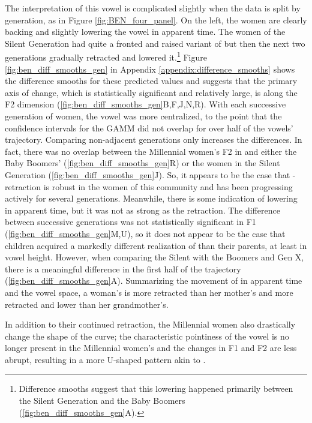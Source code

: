 The interpretation of this vowel is complicated slightly when the data is split by generation, as in Figure \ref{fig:BEN_four_panel}. On the left, the women are clearly backing and slightly lowering the vowel in apparent time. The women of the Silent Generation had quite a fronted and raised variant of \ben but then the next two generations gradually retracted and lowered it.\footnote{Difference smooths suggest that this lowering happened primarily between the Silent Generation and the Baby Boomers (\ref{fig:ben_diff_smooths_gen}A).} Figure \ref{fig:ben_diff_smooths_gen} in Appendix \ref{appendix:difference_smooths} shows the difference smooths for these predicted values and suggests that the primary axis of change, which is statistically significant and relatively large, is along the F2 dimension (\ref{fig:ben_diff_smooths_gen}B,F,J,N,R). With each successive generation of women, the vowel was more centralized, to the point that the confidence intervals for the GAMM did not overlap for over half of the vowels' trajectory. Comparing non-adjacent generations only increases the differences. In fact, there was no overlap between the Millennial women's F2 in \ben and either the Baby Boomers' (\ref{fig:ben_diff_smooths_gen}R) or the women in the Silent Generation (\ref{fig:ben_diff_smooths_gen}J). So, it appears to be the case that \ben-retraction is robust in the women of this community and has been progressing actively for several generations. Meanwhile, there is some indication of \ben lowering in apparent time, but it was not as strong as the retraction. The difference between successive generations was not statistically significant in F1 (\ref{fig:ben_diff_smooths_gen}M,U), so it does not appear to be the case that children acquired a markedly different realization of \ben than their parents, at least in vowel height. However, when comparing the Silent with the Boomers and Gen X, there is a meaningful difference in the first half of the trajectory (\ref{fig:ben_diff_smooths_gen}A). Summarizing the movement of \ben in apparent time and the vowel space, a woman's \ben is more retracted than her mother's and more retracted and lower than her grandmother's.

In addition to their continued retraction, the Millennial women also drastically change the shape of the curve; the characteristic pointiness of the vowel is no longer present in the Millennial women's \bet and the changes in F1 and F2 are less abrupt, resulting in a more U-shaped pattern akin to \bet.

